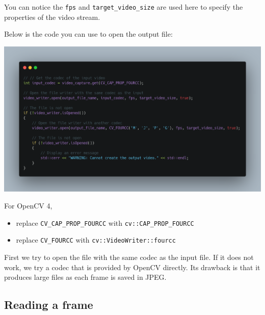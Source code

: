 \documentclass[english,a4paper,12pt,oneside]{article}
\begin{document}
You can notice the \verb+fps+ and \verb+target_video_size+ are used here to specify the properties of the video stream. 

Below is the code you can use to open the output file:

% 
% 
% 
\includegraphics[width=\linewidth]{carbon(8)}

For OpenCV 4,
\begin{itemize}
\item replace \verb+CV_CAP_PROP_FOURCC+ with \verb+cv::CAP_PROP_FOURCC+
\item replace \verb+CV_FOURCC+ with \verb+cv::VideoWriter::fourcc+
\end{itemize}

First we try to open the file with the same codec as the input file. 
If it does not work, we try a codec that is provided by OpenCV directly. 
Its drawback is that it produces large files as each frame is saved in JPEG. 



\newpage
\subsection{Reading a frame}
\end{document}
